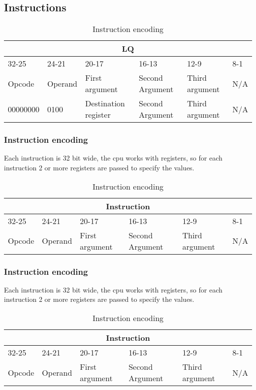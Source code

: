 \documentclass{article}
\begin{document}
\subsection{Instructions}
\begin{table}[h!]
\centering
\begin{tabular} { | p{2cm} | | p{2cm} | p{3cm} | | p{3cm} | | p{3cm}| | p{3cm} |}
  \hline
  \multicolumn{6}{|c|}{LQ}\\
  \hline
  32-25 & 24-21 & 20-17 & 16-13 & 12-9 & 8-1\\
  \hline
  Opcode & Operand & First argument & Second Argument & Third argument & N/A\\
  00000000 & 0100 & Destination register & Second Argument & Third argument & N/A\\
  \hline
\end{tabular}
\caption{Instruction encoding}
\end{table}

\subsubsection{Instruction encoding}
Each instruction is 32 bit wide, the cpu works with registers, so for each instruction 2 or more registers are passed to specify the values.
\begin{table}[h!]
\centering
\begin{tabular} { | p{2cm} | | p{2cm} | p{3cm} | | p{3cm} | | p{3cm}| | p{3cm} |}
  \hline
  \multicolumn{6}{|c|}{Instruction}\\
  \hline
  32-25 & 24-21 & 20-17 & 16-13 & 12-9 & 8-1\\
  \hline
  Opcode & Operand & First argument & Second Argument & Third argument & N/A\\
  \hline
\end{tabular}
\caption{Instruction encoding}
\end{table}

\subsubsection{Instruction encoding}
Each instruction is 32 bit wide, the cpu works with registers, so for each instruction 2 or more registers are passed to specify the values.
\begin{table}[h!]
\centering
\begin{tabular} { | p{2cm} | | p{2cm} | p{3cm} | | p{3cm} | | p{3cm}| | p{3cm} |}
  \hline
  \multicolumn{6}{|c|}{Instruction}\\
  \hline
  32-25 & 24-21 & 20-17 & 16-13 & 12-9 & 8-1\\
  \hline
  Opcode & Operand & First argument & Second Argument & Third argument & N/A\\
  \hline
\end{tabular}
\caption{Instruction encoding}
\end{table}
\end{document}
